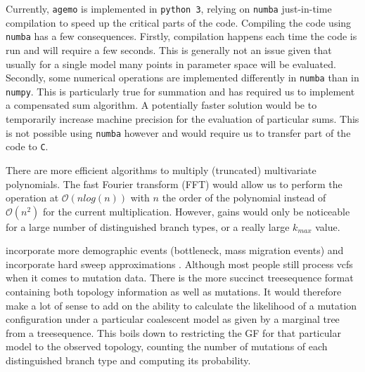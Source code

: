 \documentclass[10pt, a4]{article}
\begin{document}
Currently, \texttt{agemo} is implemented in \texttt{python 3}, relying on \texttt{numba} just-in-time compilation to speed up the critical parts of the code. Compiling the code using \texttt{numba} has a few consequences. Firstly, compilation happens each time the code is run and will require a few seconds. This is generally not an issue given that usually for a single model many points in parameter space will be evaluated. Secondly, some numerical operations are implemented differently in \texttt{numba} than in \texttt{numpy}. This is particularly true for summation and has required us to implement a compensated sum algorithm. A potentially faster solution would be to temporarily increase machine precision for the evaluation of particular sums. This is not possible using \texttt{numba} however and would require us to transfer part of the code to \texttt{C}. 

There are more efficient algorithms to multiply (truncated) multivariate polynomials. The fast Fourier transform (FFT) would allow us to perform the operation at $\mathcal{O}(n log(n))$ with $n$ the order of the polynomial instead of $\mathcal{O}(n^2)$ for the current multiplication. However, gains would only be noticeable for a large number of distinguished branch types, or a really large $k_{max}$ value. 
\newline


incorporate more demographic events (bottleneck, mass migration events) and incorporate hard sweep approximations \citep{Bisschop2021}.
Although most people still process vcfs when it comes to mutation data. There is the more succinct treesequence format containing both topology information as well as mutations. It would therefore make a lot of sense to add on the ability to calculate the likelihood of a mutation configuration under a particular coalescent model as given by a marginal tree from a treesequence. This boils down to restricting the GF for that particular model to the observed topology, counting the number of mutations of each distinguished branch type and computing its probability.

\end{document}
